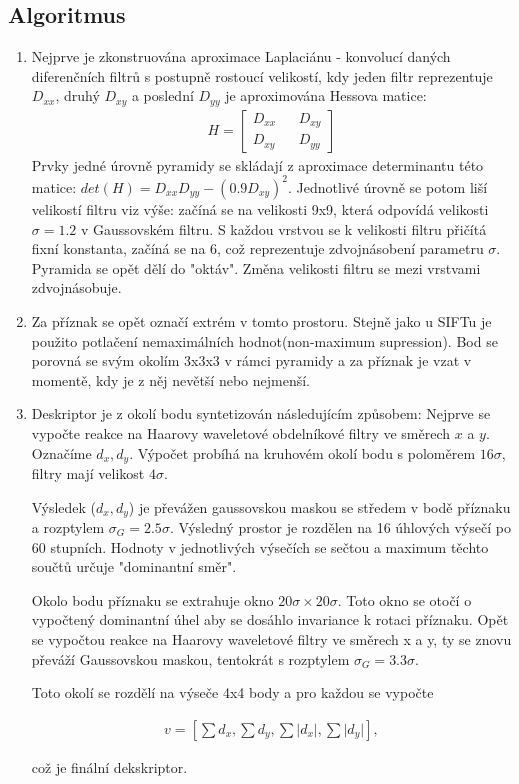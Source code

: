 \subsection{Algoritmus}

	\begin{enumerate}
		\item Nejprve je zkonstruována aproximace Laplaciánu - konvolucí daných diferenčních filtrů s postupně rostoucí velikostí, kdy jeden filtr reprezentuje $D_{xx}$, druhý $D_{xy}$ a poslední $D_{yy}$ je aproximována Hessova matice:
		\begin{align}
			H = \begin{bmatrix}
			D_{xx} && D_{xy} \\ 
			D_{xy} && D_{yy}
			\end{bmatrix}
		\end{align}
		Prvky jedné úrovně pyramidy se skládají z aproximace determinantu této matice: $det(H) = D_{xx}D_{yy} - (0.9D_{xy})^2$. Jednotlivé úrovně se potom liší velikostí filtru viz výše: začíná se na velikosti 9x9, která odpovídá velikosti $\sigma = 1.2$ v Gaussovském filtru. S každou vrstvou se k velikosti filtru přičítá fixní konstanta, začíná se na 6, což reprezentuje zdvojnásobení parametru $\sigma$. Pyramida se opět dělí do "oktáv". Změna velikosti filtru se mezi vrstvami zdvojnásobuje.
			
		\item Za příznak se opět označí extrém v tomto prostoru. Stejně jako u SIFTu je použito potlačení nemaximálních hodnot(non-maximum supression). Bod se porovná se svým okolím 3x3x3 v rámci pyramidy a za příznak je vzat v momentě, kdy je z něj nevětší nebo nejmenší.
		
		\item Deskriptor je z okolí bodu syntetizován následujícím způsobem: Nejprve se vypočte reakce na Haarovy waveletové obdelníkové filtry ve směrech $x$ a $y$. Označíme $d_x, d_y$. Výpočet probíhá na kruhovém okolí bodu s poloměrem $16\sigma$, filtry mají velikost $4\sigma$. 
		
		Výsledek ($d_x, d_y$) je převážen gaussovskou maskou se středem v bodě příznaku a rozptylem $\sigma_{G} = 2.5\sigma{}$. Výsledný prostor je rozdělen na 16 úhlových výsečí po 60 stupních. Hodnoty v jednotlivých výsečích se sečtou a maximum těchto součtů určuje "dominantní směr".
		
		Okolo bodu příznaku se extrahuje okno $20\sigma{} \times 20\sigma{}$. Toto okno se otočí o vypočtený dominantní úhel aby se dosáhlo invariance k rotaci příznaku. Opět se vypočtou reakce na Haarovy waveletové filtry ve směrech x a y, ty se znovu převáží Gaussovskou maskou, tentokrát s rozptylem $\sigma_G = 3.3\sigma$. 
		
		Toto okolí se rozdělí na výseče 4x4 body a pro každou se vypočte 
		
		\begin{align}
		v = [\sum d_x, \sum d_y, \sum\lvert d_x \rvert, \sum\lvert d_y \rvert ],
		\end{align}
		
		což je finální dekskriptor.
		
	\end{enumerate}
	
